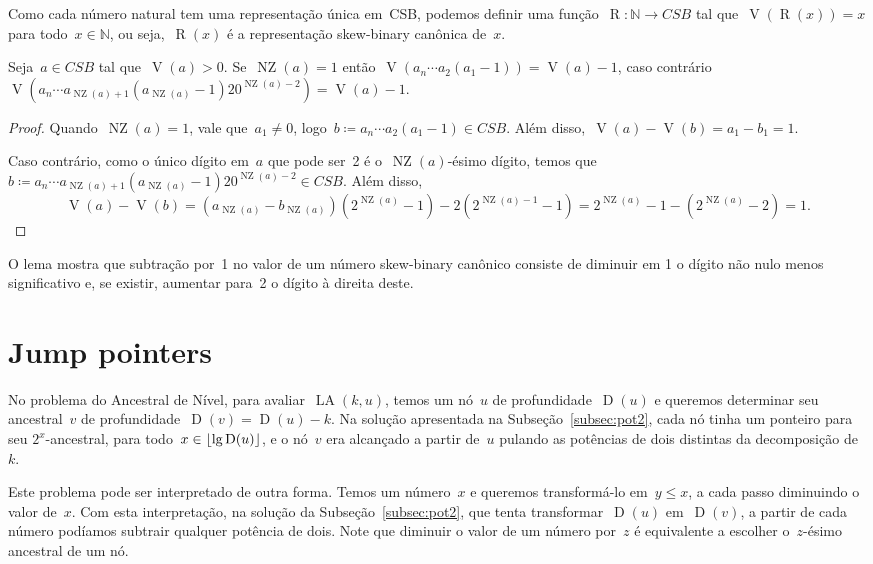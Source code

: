 \documentclass[main.tex]{subfiles}
\newcommand{\LA}{\operatorname{LA}}
\newcommand{\Dep}{\operatorname{D}}
\newcommand{\NZ}{\operatorname{NZ}}
\newcommand{\CSB}{\textit{CSB}}
\renewcommand{\V}{\operatorname{V}}
\newcommand{\R}{\operatorname{R}}
\begin{document}
Como cada número natural tem uma representação única em~CSB, podemos definir uma função~${\R: \mathbb{N} \rightarrow \CSB}$ tal que~$\V(\R(x)) = x$ para todo~$x \in \mathbb{N}$, ou seja,~$\R(x)$ é a representação skew-binary canônica de~$x$.

\begin{lemma} \label{lem:csbsub}
	Seja~$a \in \CSB$ tal que~$\V(a) > 0$. Se~$\NZ(a) = 1$ então~$\V(a_n \cdots a_2 (a_1-1)) = \V(a) - 1$, caso contrário~${\V(a_n \cdots a_{\NZ(a)+1} (a_{\NZ(a)} - 1) 2 0^{\NZ(a) - 2}) = \V(a) - 1}$.
\end{lemma}
\begin{proof}
	Quando~$\NZ(a) = 1$, vale que~$a_1 \neq 0$, logo~${b \coloneqq a_n \cdots a_2 (a_1-1) \in \CSB}$. Além disso,~${\V(a) - \V(b) = a_1 - b_1 = 1}$.

	Caso contrário, como o único dígito em~$a$ que pode ser~2 é o~$\NZ(a)$-ésimo dígito, temos que~${b \coloneqq a_n \cdots a_{\NZ(a)+1} (a_{\NZ(a)} - 1) 2 0^{\NZ(a) - 2} \in \CSB}$. Além disso,
	$$ \V(a) - \V(b) = (a_{\NZ(a)} - b_{\NZ(a)}) (2^{\NZ(a)} - 1) - 2 (2^{\NZ(a) - 1} - 1) = 2^{\NZ(a)} - 1 - (2^{\NZ(a)} - 2) = 1. $$
\end{proof}

O lema mostra que subtração por~1 no valor de um número skew-binary canônico consiste de diminuir em 1 o dígito não nulo menos significativo e, se existir, aumentar para~2 o dígito à direita deste.

\section{Jump pointers}

No problema do Ancestral de Nível, para avaliar~$\LA(k, u)$, temos um nó~$u$ de profundidade~$\Dep(u)$ e queremos determinar seu ancestral~$v$ de profundidade~${\Dep(v) = \Dep(u) - k}$. Na solução apresentada na Subseção~\ref{subsec:pot2}, cada nó tinha um ponteiro para seu $2^x$-ancestral, para todo~${x \in \floor{\lg\Dep(u)}}$, e o nó~$v$ era alcançado a partir de~$u$ pulando as potências de dois distintas da decomposição de~$k$.

Este problema pode ser interpretado de outra forma. Temos um número~$x$ e queremos transformá-lo em~$y \leq x$, a cada passo diminuindo o valor de~$x$. Com esta interpretação, na solução da Subseção~\ref{subsec:pot2}, que tenta transformar~$\Dep(u)$ em~$\Dep(v)$, a partir de cada número podíamos subtrair qualquer potência de dois. Note que diminuir o valor de um número por~$z$ é equivalente a escolher o~$z$-ésimo ancestral de um nó.
\end{document}
